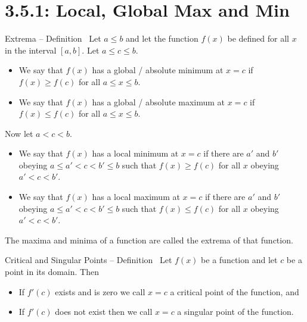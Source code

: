 \section*{3.5.1: Local, Global Max and Min}
%
\begin{frame}[t]
\begin{block}{Extrema -- Definition~}
Let $a \le b$ and let the function $f(x)$ be defined for all $x$ in the interval $[a,b]$. Let $a \le c \le b$.
\begin{itemize}
\item We say that $f(x)$ has a \alert{global / absolute minimum} at $x=c$ if $f(x) \ge f(c)$ for all $a \le x \le b$.
\item We say that $f(x)$ has a \alert{global / absolute maximum} at $x=c$ if $f(x) \le f(c)$ for all $a \le x \le b$.
\end{itemize}
Now let $a<c<b$.
\begin{itemize}
\item We say that $f(x)$ has a \alert{local minimum} at $x=c$ if there are $a'$ and $b'$ obeying
$a \le a' < c < b' \le b$ such that $f(x) \ge f(c)$ for all $x$ obeying $a' < c < b'$.
\item We say that $f(x)$ has a \alert{local maximum} at $x=c$ if there are $a'$ and $b'$ obeying
$a \le a' < c < b' \le b$ such that $f(x) \le f(c)$ for all $x$ obeying $a' < c < b'$.
\end{itemize}
The maxima and minima of a function are called the \alert{extrema} of that function.
\end{block}
\end{frame}
\begin{frame}
\begin{block}{Critical and Singular Points -- Definition~}
Let $f(x)$ be a function and let $c$ be a point in its domain. Then
\begin{itemize}
\item If $f'(c)$ exists and is zero we call $x=c$ a \alert{critical point} of the function, and
\item If $f'(c)$ does not exist then we call $x=c$ a \alert{singular point} of the function.
\end{itemize}
\end{block}
\end{frame}

